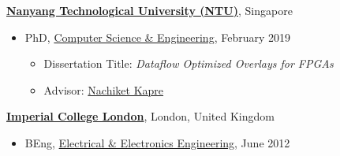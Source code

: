 \documentclass[10pt]{article}
\newenvironment{outerlist}[1][\enskip\textbullet]%
        {\begin{itemize}[#1,leftmargin=*]}{\end{itemize}%
         \vspace{-.6\baselineskip}}
\newenvironment{innerlist}[1][\enskip\textbullet]%
        {\begin{itemize}[#1,leftmargin=*,parsep=0pt,itemsep=0pt,topsep=0pt,partopsep=0pt]}
        {\end{itemize}}
\begin{document}
\href{http://www.ntu.edu.sg}{\textbf{Nanyang Technological University (NTU)}},
Singapore
\begin{outerlist}

\item[] PhD,
        \href{http://scse.ntu.edu.sg/}
			{Computer Science \& Engineering},
             February 2019
        \begin{innerlist}
        \item Dissertation Title: \emph{Dataflow Optimized Overlays for FPGAs}
        \item Advisor:
              \href{https://nachiket.github.io/}{Nachiket Kapre}
        \end{innerlist}
\end{outerlist}
\vspace{.1in}
\href{http://www.imperial.ac.uk/}{\textbf{Imperial College London}},
London, United Kingdom 
\begin{outerlist}
\item[] BEng,
        \href{http://www.imperial.ac.uk/electrical-engineering}
			{Electrical \& Electronics Engineering}, June 2012 
\end{outerlist}

\end{document}
